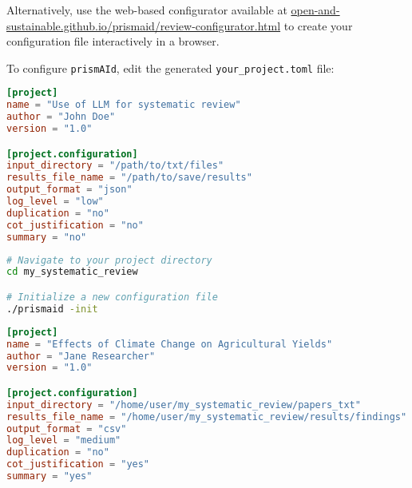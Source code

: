 Alternatively, use the web-based configurator available at \href{https://open-and-sustainable.github.io/prismaid/review-configurator.html}{open-and-sustainable.github.io/prismaid/review-configurator.html} to create your configuration file interactively in a browser.

\begin{configbox}
To configure \texttt{prismAId}, edit the generated \texttt{your\_project.toml} file:
\begin{lstlisting}[language=TOML]
[project]
name = "Use of LLM for systematic review"
author = "John Doe"
version = "1.0"

[project.configuration]
input_directory = "/path/to/txt/files"
results_file_name = "/path/to/save/results"
output_format = "json"
log_level = "low"
duplication = "no"
cot_justification = "no"
summary = "no"
\end{lstlisting}
\end{configbox}

\begin{commandbox}
\begin{lstlisting}[language=Bash]
# Navigate to your project directory
cd my_systematic_review

# Initialize a new configuration file
./prismaid -init
\end{lstlisting}
\end{commandbox}


\begin{configbox}
\begin{lstlisting}[language=TOML]
[project]
name = "Effects of Climate Change on Agricultural Yields"
author = "Jane Researcher"
version = "1.0"

[project.configuration]
input_directory = "/home/user/my_systematic_review/papers_txt"
results_file_name = "/home/user/my_systematic_review/results/findings"
output_format = "csv"
log_level = "medium"
duplication = "no"
cot_justification = "yes"
summary = "yes"
\end{lstlisting}
\end{configbox}

